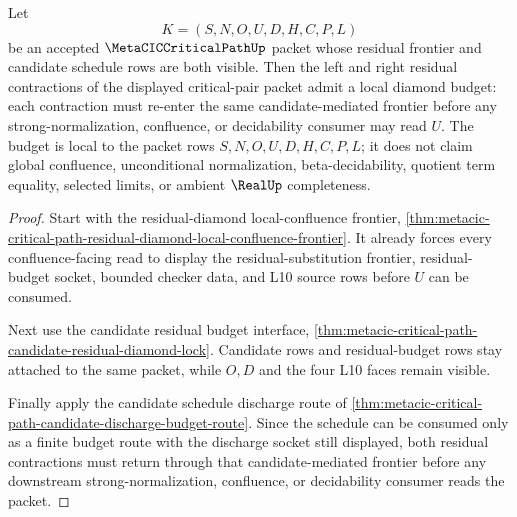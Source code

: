 \begin{theorem}
\label{thm:metacic-critical-path-residual-schedule-diamond}
Let
$$
K=(S,N,O,U,D,H,C,P,L)
$$
be an accepted $\MetaCICCriticalPathUp$ packet whose residual frontier and candidate schedule rows are both visible. Then the left and right residual contractions of the displayed critical-pair packet admit a local diamond budget: each contraction must re-enter the same candidate-mediated frontier before any strong-normalization, confluence, or decidability consumer may read $U$. The budget is local to the packet rows $S,N,O,U,D,H,C,P,L$; it does not claim global confluence, unconditional normalization, beta-decidability, quotient term equality, selected limits, or ambient $\RealUp$ completeness.
\end{theorem}
\begin{proof}
Start with the residual-diamond local-confluence frontier, \autoref{thm:metacic-critical-path-residual-diamond-local-confluence-frontier}. It already forces every confluence-facing read to display the residual-substitution frontier, residual-budget socket, bounded checker data, and L10 source rows before $U$ can be consumed.

Next use the candidate residual budget interface, \autoref{thm:metacic-critical-path-candidate-residual-diamond-lock}. Candidate rows and residual-budget rows stay attached to the same packet, while $O,D$ and the four L10 faces remain visible.

Finally apply the candidate schedule discharge route of \autoref{thm:metacic-critical-path-candidate-discharge-budget-route}. Since the schedule can be consumed only as a finite budget route with the discharge socket still displayed, both residual contractions must return through that candidate-mediated frontier before any downstream strong-normalization, confluence, or decidability consumer reads the packet.
\end{proof}

